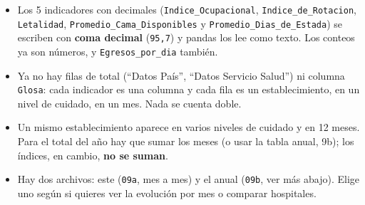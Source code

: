 \documentclass[10.5pt]{article}
\begin{document}
\begin{alertabox}
\begin{itemize}[leftmargin=1.1em,itemsep=2pt,topsep=2pt]
\item Los 5 indicadores con decimales (\texttt{Indice\_\allowbreak{}Ocupacional}, \texttt{Indice\_\allowbreak{}de\_\allowbreak{}Rotacion}, \texttt{Letalidad}, \texttt{Promedio\_\allowbreak{}Cama\_\allowbreak{}Disponibles} y \texttt{Promedio\_\allowbreak{}Dias\_\allowbreak{}de\_\allowbreak{}Estada}) se escriben con \textbf{coma decimal} (\texttt{95,7}) y pandas los lee como texto. Los conteos ya son números, y \texttt{Egresos\_\allowbreak{}por\_\allowbreak{}dia} también.
\item Ya no hay filas de total (``Datos País'', ``Datos Servicio Salud'') ni columna \texttt{Glosa}: cada indicador es una columna y cada fila es un establecimiento, en un nivel de cuidado, en un mes. Nada se cuenta doble.
\item Un mismo establecimiento aparece en varios niveles de cuidado y en 12 meses. Para el total del año hay que sumar los meses (o usar la tabla anual, 9b); los índices, en cambio, \textbf{no se suman}.
\item Hay dos archivos: este (\texttt{09a}, mes a mes) y el anual (\texttt{09b}, ver más abajo). Elige uno según si quieres ver la evolución por mes o comparar hospitales.
\end{itemize}
\end{alertabox}

\newpage
{}\label{base9b}\hypertarget{base9b}{}
\end{document}
